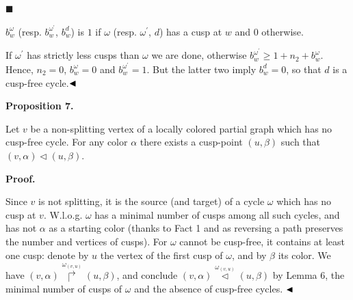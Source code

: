 \documentclass[10pt,a4paper]{amsart}
\begin{document}
 
\par\noindent  $\blacksquare$ 
 
$b^{\omega}_{w}$ (resp. $b^{\omega^{\prime}}_{w}$, $b^{d}_{w}$) is $1$ if $\omega$ (resp. $\omega^{\prime}$, $d$) has a cusp at $w$ and $0$ otherwise.\par
 
 
  
If $\omega^{\prime}$ has strictly less cusps than $\omega$ we are done, otherwise $b^{\omega^{\prime}}_{w}\geq 1+n_{2}+b^{\omega}_{w}$. Hence, $n_{2}=0$, $b^{\omega}_{w}=0$ and $b^{\omega^{\prime}}_{w}=1$. But the latter two imply $b^{d}_{w}=0$, so that $d$ is a cusp-free cycle.$\hfill\blacktriangleleft$\par
 
 
 
\par\medskip\noindent\textbf{Proposition 7.}\par
 
 
Let $v$ be a non-splitting vertex of a locally colored partial graph which has no cusp-free cycle. For any color $\alpha$ there exists a cusp-point $(u,\beta)$ such that $(v,\alpha)\lhd(u,\beta)$.\par
 
 
 
 
 
\par\medskip\noindent\textbf{Proof.}\par
 
 
Since $v$ is not splitting, it is the source (and target) of a cycle $\omega$ which has no cusp at $v$. W.l.o.g. $\omega$ has a minimal number of cusps among all such cycles, and has not $\alpha$ as a starting color (thanks to Fact 1 and as reversing a path preserves the number and vertices of cusps). For $\omega$ cannot be cusp-free, it contains at least one cusp: denote by $u$ the vertex of the first cusp of $\omega$, and by $\beta$ its color. We have $(v,\alpha)\overset{{\omega}_{(v,u)}}{\Rsh}(u,\beta)$, and conclude $(v,\alpha)\overset{{\omega}_{(v,u)}}{\lhd}(u,\beta)$ by Lemma 6, the minimal number of cusps of $\omega$ and the absence of cusp-free cycles. $\hfill\blacktriangleleft$\par
 
\end{document}
